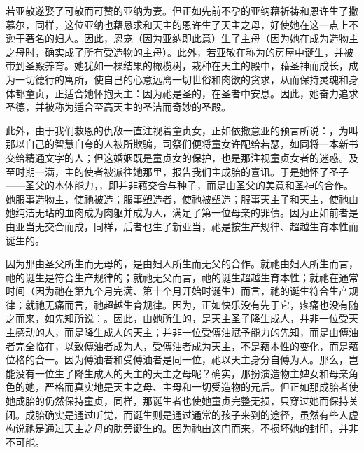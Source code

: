 若亚敬遂娶了可敬而可赞的亚纳为妻。但正如先前不孕的亚纳藉祈祷和恩许生了撒慕尔，同样，这位亚纳也藉恳求和天主的恩许生了天主之母，好使她在这一点上不逊于著名的妇人。因此，恩宠（因为亚纳即此意）生了主母（因为她在成为造物主之母时，确实成了所有受造物的主母）。此外，若亚敬在称为的房屋中诞生，并被带到圣殿养育。她犹如一棵结果的橄榄树，栽种在天主的殿中，藉圣神而成长，成为一切德行的寓所，使自己的心意远离一切世俗和肉欲的贪求，从而保持灵魂和身体都童贞，正适合她怀抱天主：因为祂是圣的，在圣者中安息。因此，她奋力追求圣德，并被称为适合至高天主的圣洁而奇妙的圣殿。\par

此外，由于我们救恩的仇敌一直注视着童贞女，正如依撒意亚的预言所说：，为叫那以自己的智慧自夸的人被所欺骗，司祭们便将童女许配给若瑟，如同将一本新书交给精通文字的人；但这婚姻既是童贞女的保护，也是那注视童贞女者的迷惑。及至时期一满，主的使者被派往她那里，报告我们主成胎的喜讯。于是她怀了圣子——圣父的本体能力，，即并非藉交合与种子，而是由圣父的美意和圣神的合作。她服事造物主，使祂被造；服事塑造者，使祂被塑造；服事天主子和天主，使祂由她纯洁无玷的血肉成为肉躯并成为人，满足了第一位母亲的罪债。因为正如前者是由亚当无交合而成，同样，后者也生了新亚当，祂是按生产规律、超越生育本性而诞生的。\par

因为那由圣父所生而无母的，是由妇人所生而无父的合作。就祂由妇人所生而言，祂的诞生是符合生产规律的；就祂无父而言，祂的诞生超越生育本性；就祂在通常时间（因为祂在第九个月完满、第十个月开始时诞生）而言，祂的诞生符合生产规律；就祂无痛而言，祂超越生育规律。因为，正如快乐没有先于它，疼痛也没有随之而来，如先知所说：。因此，由她所生的，是天主圣子降生成人，并非一位受天主感动的人，而是降生成人的天主；并非一位受傅油赋予能力的先知，而是由傅油者完全临在，以致傅油者成为人，受傅油者成为天主，不是藉本性的变化，而是藉位格的合一。因为傅油者和受傅油者是同一位，祂以天主身分自傅为人。那么，岂能没有一位生了降生成人的天主的天主之母呢？确实，那扮演造物主婢女和母亲角色的她，严格而真实地是天主之母、主母和一切受造物的元后。但正如那成胎者使她成胎的仍然保持童贞，同样，那诞生者也使她童贞完整无损，只穿过她而保持关闭。成胎确实是通过听觉，而诞生则是通过通常的孩子来到的途径，虽然有些人虚构说祂是通过天主之母的肋旁诞生的。因为祂由这门而来，不损坏她的封印，并非不可能。\par

